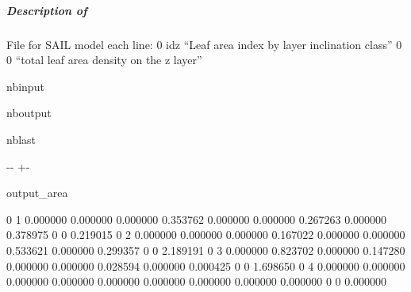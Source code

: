 \documentclass[letterpaper,10pt,english]{sphinxmanual}
\begin{document}
\subparagraph{Description of }
\label{\detokenize{misc_functionnalities:id1}}
\sphinxAtStartPar
File for SAIL model each line: \sphinxhyphen{} 0 idz “Leaf area index by layer inclination class” 0 0 “total leaf area density on the z layer”

\begin{sphinxuseclass}{nbinput}
{
\begin{sphinxVerbatim}[commandchars=\\\{\}]
\llap{\color{nbsphinxin}[16]:\,\hspace{\fboxrule}\hspace{\fboxsep}}    
    
       
         
\end{sphinxVerbatim}
}

\end{sphinxuseclass}
\begin{sphinxuseclass}{nboutput}
\begin{sphinxuseclass}{nblast}
{

\kern-\sphinxverbatimsmallskipamount\kern-\baselineskip
\kern+\FrameHeightAdjust\kern-\fboxrule
\vspace{\nbsphinxcodecellspacing}

\begin{sphinxuseclass}{output_area}
\begin{sphinxuseclass}{}


\begin{sphinxVerbatim}[commandchars=\\\{\}]
  0  1  0.000000 0.000000 0.000000 0.353762 0.000000 0.000000 0.267263 0.000000 0.378975 0 0 0.219015
  0  2  0.000000 0.000000 0.000000 0.167022 0.000000 0.000000 0.533621 0.000000 0.299357 0 0 2.189191
  0  3  0.000000 0.823702 0.000000 0.147280 0.000000 0.000000 0.028594 0.000000 0.000425 0 0 1.698650
  0  4  0.000000 0.000000 0.000000 0.000000 0.000000 0.000000 0.000000 0.000000 0.000000 0 0 0.000000
\end{sphinxVerbatim}



\end{sphinxuseclass}
\end{sphinxuseclass}
}

\end{sphinxuseclass}
\end{sphinxuseclass}
\sphinxstepscope
\end{document}
